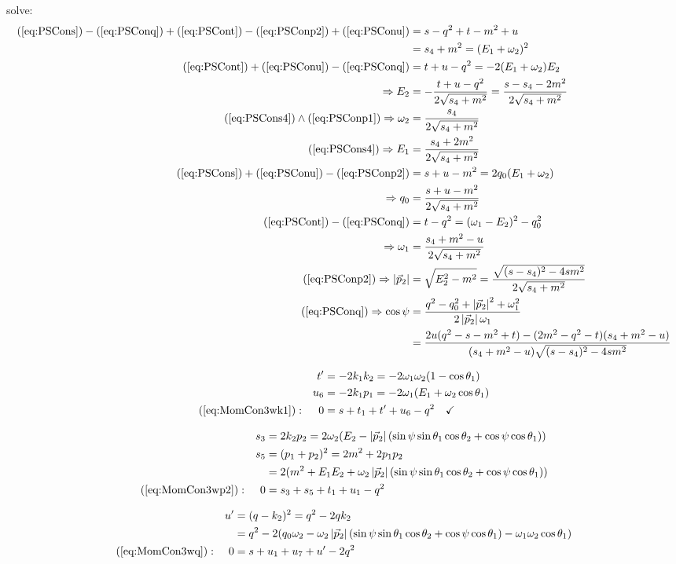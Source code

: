 \documentclass[
  ngerman,		%
  a4paper,		%
  11pt,			%
  DIV=12,		%
  parskip=half  	%
]{scrartcl}
\begin{document}
solve:
\begin{align}
(\ref{eq:PSCons}) - (\ref{eq:PSConq}) + (\ref{eq:PSCont}) - (\ref{eq:PSConp2}) + (\ref{eq:PSConu}) &= s-q^2+t-m^2+u\\
 &= s_4+m^2 = (E_1+\omega_2)^2 \label{eq:PSCons4}\\
(\ref{eq:PSCont}) + (\ref{eq:PSConu}) - (\ref{eq:PSConq}) &= t+u-q^2 = -2(E_1+\omega_2)E_2\\
\Rightarrow E_2 &= -\frac{t+u-q^2}{2\sqrt{s_4+m^2}} =\frac{s-s_4-2m^2}{2\sqrt{s_4+m^2}} \label{eq:PSConE2}\\
(\ref{eq:PSCons4})\land (\ref{eq:PSConp1}) \Rightarrow \omega_2 &= \frac{s_4}{2\sqrt{s_4+m^2}} \label{eq:PSConom2} \\
(\ref{eq:PSCons4})\Rightarrow E_1 &= \frac{s_4+2m^2}{2\sqrt{s_4+m^2}} \label{eq:PSConE1} \\
(\ref{eq:PSCons})+(\ref{eq:PSConu})-(\ref{eq:PSConp2}) &= s+u-m^2 =2q_0(E_1+\omega_2)\\
\Rightarrow q_0 &= \frac{s+u-m^2}{2\sqrt{s_4+m^2}} \label{eq:PSConq0}\\
(\ref{eq:PSCont}) - (\ref{eq:PSConq}) &= t-q^2 = (\omega_1-E_2)^2 - q_0^2\\
\Rightarrow \omega_1 &= \frac{s_4+m^2-u}{2\sqrt{s_4+m^2}} \label{eq:PSConom1}\\
(\ref{eq:PSConp2}) \Rightarrow \left|\vec p_2\right| &= \sqrt{E_2^2 - m^2} = \frac {\sqrt{(s-s_4)^2-4sm^2}} {2\sqrt{s_4+m^2}}\label{eq:PSConabsp2}\\
(\ref{eq:PSConq}) \Rightarrow \cos\psi &= \frac{q^2-q_0^2+\left|\vec p_2\right|^2+\omega_1^2}{2\left|\vec p_2\right|\omega_1}\\
 &= \frac {2u(q^2-s-m^2+t)-(2m^2-q^2-t)(s_4+m^2-u)} {(s_4+m^2-u)\sqrt{(s-s_4)^2-4sm^2}}\label{eq:PSConabcos}
\end{align}

\begin{align}
&&t' &= -2k_1k_2 = -2\omega_1\omega_2(1-\cos\theta_1)\\
&&u_6 &= - 2k_1p_1 = -2\omega_1(E_1 + \omega_2\cos\theta_1)\\
(\ref{eq:MomCon3wk1}): &&0 &= s+t_1+t'+u_6-q^2\quad\checkmark
\end{align}

\begin{align}
&&s_3 &= 2k_2p_2 = 2\omega_2(E_2-\left|\vec p_2\right|(\sin\psi\sin\theta_1\cos\theta_2+\cos\psi\cos\theta_1))\\
&&s_5 &= (p_1+p_2)^2 = 2m^2+2p_1p_2\\
&& &= 2(m^2+E_1E_2+\omega_2\left|\vec p_2\right|(\sin\psi\sin\theta_1\cos\theta_2+\cos\psi\cos\theta_1))\\
(\ref{eq:MomCon3wp2}): &&0 &= s_3+s_5+t_1+u_1-q^2
\end{align}

\begin{align}
&&u' &=(q-k_2)^2 = q^2-2qk_2\\
&& &= q^2-2(q_0\omega_2 -\omega_2\left|\vec p_2\right|(\sin\psi\sin\theta_1\cos\theta_2+\cos\psi\cos\theta_1)-\omega_1\omega_2\cos\theta_1)\\
(\ref{eq:MomCon3wq}): &&0 &=s+u_1+u_7+u'-2q^2
\end{align}
\end{document}
